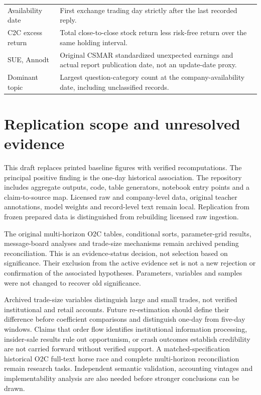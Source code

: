 \begin{table}[H]
\begin{tabularx}{\textwidth}{@{}p{}X@{}}
Availability date & First exchange trading day strictly after the last recorded reply.\\
C2C excess return & Total close-to-close stock return less risk-free return over the same holding interval.\\
SUE, Annodt & Original CSMAR standardized unexpected earnings and actual report publication date, not an update-date proxy.\\
Dominant topic & Largest question-category count at the company-availability date, including unclassified records.\\
\bottomrule\end{tabularx}
\end{table}

\section{Replication scope and unresolved evidence}
This draft replaces printed baseline figures with verified recomputations. The principal positive finding is the one-day historical association. The repository includes aggregate outputs, code, table generators, notebook entry points and a claim-to-source map. Licensed raw and company-level data, original teacher annotations, model weights and record-level text remain local. Replication from frozen prepared data is distinguished from rebuilding licensed raw ingestion.

The original multi-horizon O2C tables, conditional sorts, parameter-grid results, message-board analyses and trade-size mechanisms remain archived pending reconciliation. This is an evidence-status decision, not selection based on significance. Their exclusion from the active evidence set is not a new rejection or confirmation of the associated hypotheses. Parameters, variables and samples were not changed to recover old significance.

Archived trade-size variables distinguish large and small trades, not verified institutional and retail accounts. Future re-estimation should define their difference before coefficient comparisons and distinguish one-day from five-day windows. Claims that order flow identifies institutional information processing, insider-sale results rule out opportunism, or crash outcomes establish credibility are not carried forward without verified support. A matched-specification historical O2C full-text horse race and complete multi-horizon reconciliation remain research tasks. Independent semantic validation, accounting vintages and implementability analysis are also needed before stronger conclusions can be drawn.
